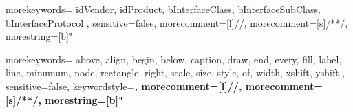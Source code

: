 
	
{
  morekeywords={
    idVendor,
    idProduct,
    bInterfaceClass,
    bInterfaceSubClass,
    bInterfaceProtocol
  },
  sensitive=false, %
  morecomment=[l]{//}, %
  morecomment=[s]{/*}{*/}, %
  morestring=[b]" %
}

{
  morekeywords={
	above,
	align,
  	begin,
	below,
  	caption,
	draw,
	end,
	every,
	fill,
	label,
  	line,
	minumum,
	node,
	rectangle,
	right,
	scale,
	size,
  	style,
	of,
  	width,
  	xshift,
  	yshift
  },
  sensitive=false, %
  keywordstyle=\color{THIblue}\bfseries,
  morecomment=[l]{//}, %
  morecomment=[s]{/*}{*/}, %
  morestring=[b]" %
}